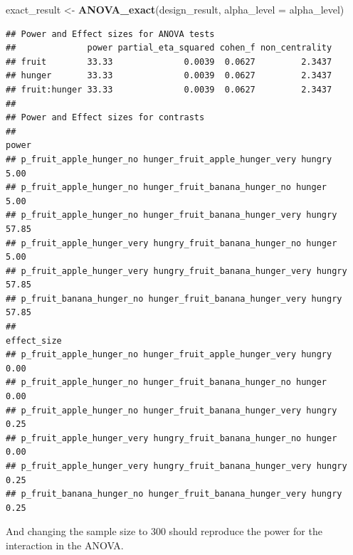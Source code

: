 \documentclass[]{book}
\newenvironment{Shaded}{\begin{snugshade}}{\end{snugshade}}
\newcommand{\DataTypeTok}[1]{\textcolor[rgb]{0.13,0.29,0.53}{#1}}
\newcommand{\KeywordTok}[1]{\textcolor[rgb]{0.13,0.29,0.53}{\textbf{#1}}}
\newcommand{\NormalTok}[1]{#1}
\newcommand{\StringTok}[1]{\textcolor[rgb]{0.31,0.60,0.02}{#1}}
\begin{document}
\begin{Shaded}
\begin{Highlighting}[]
\NormalTok{exact_result <-}\StringTok{ }\KeywordTok{ANOVA_exact}\NormalTok{(design_result, }\DataTypeTok{alpha_level =}\NormalTok{ alpha_level)}
\end{Highlighting}
\end{Shaded}

\begin{verbatim}
## Power and Effect sizes for ANOVA tests
##              power partial_eta_squared cohen_f non_centrality
## fruit        33.33              0.0039  0.0627         2.3437
## hunger       33.33              0.0039  0.0627         2.3437
## fruit:hunger 33.33              0.0039  0.0627         2.3437
## 
## Power and Effect sizes for contrasts
##                                                                  power
## p_fruit_apple_hunger_no hunger_fruit_apple_hunger_very hungry     5.00
## p_fruit_apple_hunger_no hunger_fruit_banana_hunger_no hunger      5.00
## p_fruit_apple_hunger_no hunger_fruit_banana_hunger_very hungry   57.85
## p_fruit_apple_hunger_very hungry_fruit_banana_hunger_no hunger    5.00
## p_fruit_apple_hunger_very hungry_fruit_banana_hunger_very hungry 57.85
## p_fruit_banana_hunger_no hunger_fruit_banana_hunger_very hungry  57.85
##                                                                  effect_size
## p_fruit_apple_hunger_no hunger_fruit_apple_hunger_very hungry           0.00
## p_fruit_apple_hunger_no hunger_fruit_banana_hunger_no hunger            0.00
## p_fruit_apple_hunger_no hunger_fruit_banana_hunger_very hungry          0.25
## p_fruit_apple_hunger_very hungry_fruit_banana_hunger_no hunger          0.00
## p_fruit_apple_hunger_very hungry_fruit_banana_hunger_very hungry        0.25
## p_fruit_banana_hunger_no hunger_fruit_banana_hunger_very hungry         0.25
\end{verbatim}

And changing the sample size to 300 should reproduce the power for the interaction in the ANOVA.
\end{document}
